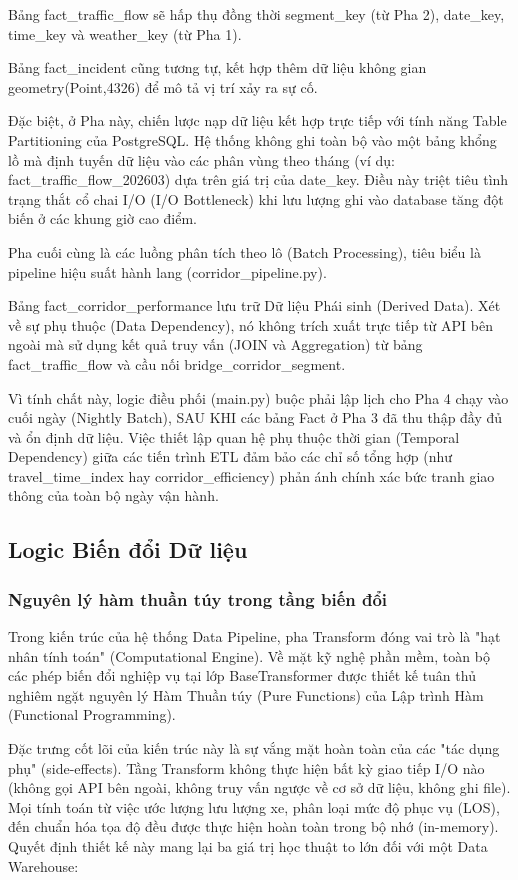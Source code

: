 Bảng fact\_traffic\_flow sẽ hấp thụ đồng thời segment\_key (từ Pha 2), date\_key, time\_key và weather\_key (từ Pha 1).


Bảng fact\_incident cũng tương tự, kết hợp thêm dữ liệu không gian geometry(Point,4326) để mô tả vị trí xảy ra sự cố.


Đặc biệt, ở Pha này, chiến lược nạp dữ liệu kết hợp trực tiếp với tính năng Table Partitioning của PostgreSQL. Hệ thống không ghi toàn bộ vào một bảng khổng lồ mà định tuyến dữ liệu vào các phân vùng theo tháng (ví dụ: fact\_traffic\_flow\_202603) dựa trên giá trị của date\_key. Điều này triệt tiêu tình trạng thắt cổ chai I/O (I/O Bottleneck) khi lưu lượng ghi vào database tăng đột biến ở các khung giờ cao điểm.


Pha cuối cùng là các luồng phân tích theo lô (Batch Processing), tiêu biểu là pipeline hiệu suất hành lang (corridor\_pipeline.py).


Bảng fact\_corridor\_performance lưu trữ Dữ liệu Phái sinh (Derived Data). Xét về sự phụ thuộc (Data Dependency), nó không trích xuất trực tiếp từ API bên ngoài mà sử dụng kết quả truy vấn (JOIN và Aggregation) từ bảng fact\_traffic\_flow và cầu nối bridge\_corridor\_segment.


Vì tính chất này, logic điều phối (main.py) buộc phải lập lịch cho Pha 4 chạy vào cuối ngày (Nightly Batch), SAU KHI các bảng Fact ở Pha 3 đã thu thập đầy đủ và ổn định dữ liệu. Việc thiết lập quan hệ phụ thuộc thời gian (Temporal Dependency) giữa các tiến trình ETL đảm bảo các chỉ số tổng hợp (như travel\_time\_index hay corridor\_efficiency) phản ánh chính xác bức tranh giao thông của toàn bộ ngày vận hành.


\subsection{Logic Biến đổi Dữ liệu}
\subsubsection{Nguyên lý hàm thuần túy trong tầng biến đổi}
Trong kiến trúc của hệ thống Data Pipeline, pha Transform đóng vai trò là "hạt nhân tính toán" (Computational Engine). Về mặt kỹ nghệ phần mềm, toàn bộ các phép biến đổi nghiệp vụ tại lớp BaseTransformer được thiết kế tuân thủ nghiêm ngặt nguyên lý Hàm Thuần túy (Pure Functions) của Lập trình Hàm (Functional Programming).


Đặc trưng cốt lõi của kiến trúc này là sự vắng mặt hoàn toàn của các "tác dụng phụ" (side-effects). Tầng Transform không thực hiện bất kỳ giao tiếp I/O nào (không gọi API bên ngoài, không truy vấn ngược về cơ sở dữ liệu, không ghi file). Mọi tính toán từ việc ước lượng lưu lượng xe, phân loại mức độ phục vụ (LOS), đến chuẩn hóa tọa độ đều được thực hiện hoàn toàn trong bộ nhớ (in-memory). Quyết định thiết kế này mang lại ba giá trị học thuật to lớn đối với một Data Warehouse:


